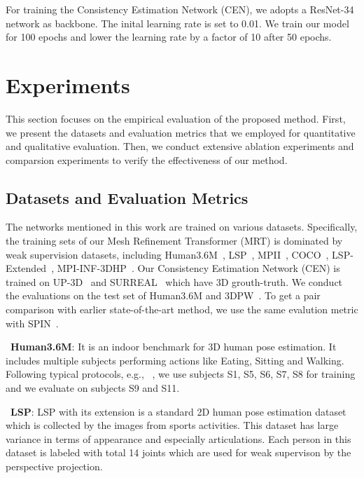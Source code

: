 \documentclass[sigconf]{acmart}
\begin{document}
For training the Consistency Estimation Network (CEN), we adopts a ResNet-34 network 
as backbone. The inital learning rate is set to 0.01. We train our model for 100 epochs and 
lower the learning rate by a factor of 10 after 50 epochs.  



\section{Experiments}
This section focuses on the empirical evaluation of the
proposed method. First, we present the datasets and evaluation metrics that
we employed for quantitative and qualitative evaluation.
Then, we conduct extensive ablation experiments and comparsion experiments to verify the 
effectiveness of our method. 


\subsection{Datasets and Evaluation Metrics}

The networks mentioned in this work are trained on various datasets. Specifically, the training sets of our 
Mesh Refinement Transformer (MRT) is dominated by weak supervision datasets, including Human3.6M~\cite{ionescu2013human3}, 
LSP~\cite{johnson2010clustered}, MPII~\cite{andriluka20142d}, COCO~\cite{lin2014microsoft}, 
LSP-Extended~\cite{johnson2011learning}, MPI-INF-3DHP~\cite{mehta2017monocular}. Our 
Consistency Estimation Network (CEN) is 
trained on UP-3D~\cite{lassner2017unite} and SURREAL~\cite{varol2017learning} which have 3D grouth-truth. We conduct the evaluations 
on the test set of Human3.6M and 3DPW~\cite{von2018recovering}. To get a pair comparison with earlier state-of-the-art method, we use the 
same evalution metric with SPIN~\cite{kolotouros2019learning}.

~\textbf{Human3.6M}: It is an indoor benchmark for 3D human pose estimation. It includes multiple subjects performing actions like Eating, Sitting and Walking. Following typical protocols, e.g., ~\cite{kolotouros2019learning}, we use subjects S1, S5, S6, S7, S8 for training and we evaluate on subjects S9 and S11. 

~\textbf{LSP}: LSP with its extension is a standard 2D human pose estimation dataset which 
is collected by the images from sports activities. This dataset has large variance in terms of appearance 
and especially articulations. Each person in this dataset is labeled with total 14 joints which are used for weak 
supervison by the perspective projection. 
\end{document}
